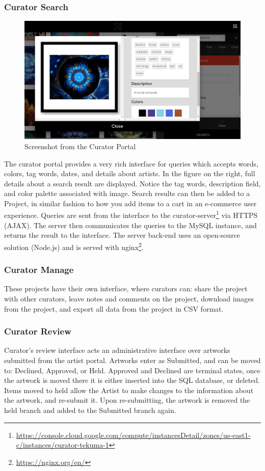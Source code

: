 \documentclass[fontsize=12pt]{scrartcl} %
\begin{document}
\subsubsection{Curator Search}
\begin{figure}
    \includegraphics[scale=0.2]{./img/curator}
    \caption{Screenshot from the Curator Portal}
    \label{}
\end{figure}


The curator portal provides a very rich interface for queries which accepts words, colors, tag words, dates, and details about artists. In the figure on the right, full details about a search result are displayed. Notice the tag words, description field, and color palette associated with image.
Search results can then be added to a Project, in similar fashion to how you add items to a cart in an e-commerce user experience. Queries are sent from the interface to the curator-server\footnote{\url{https://console.cloud.google.com/compute/instancesDetail/zones/us-east1-c/instances/curator-tekuma-1}} via HTTPS (AJAX). The server then communicates the queries to the MySQL instance, and returns the result to the interface.  The server back-end uses an open-source solution (Node.js) and is served with nginx\footnote{\url{https://nginx.org/en/}}.

\subsubsection{Curator Manage}
These projects have their own interface, where curators can: share the project with other curators, leave notes and comments on the project, download images from the project, and export all data from the project in CSV format.

\subsubsection{Curator Review}
Curator's review interface acts an administrative interface over artworks submitted from the artist portal. Artworks enter as Submitted, and can be moved to: Declined, Approved, or Held.  Approved and Declined are terminal states, once the artwork is moved there it is either inserted into the SQL database, or deleted. Items moved to held allow the Artist to make changes to the information about the artwork, and re-submit it. Upon re-submitting, the artwork is removed the held branch and added to the Submitted branch again.
\end{document}
